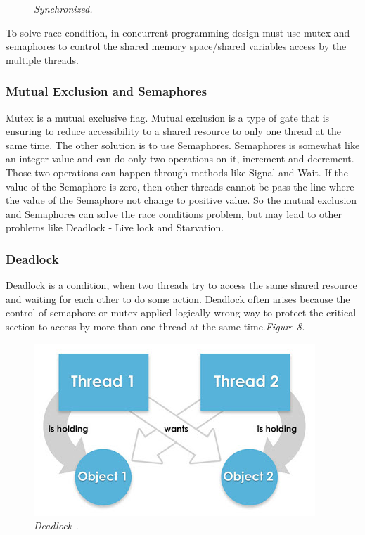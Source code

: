 \documentclass[12pt]{article}
\begin{document}
\begin{figure}[h!]
\begin{minipage}[h!]{0.4\textwidth}
    \caption{\textit{\color{gray}Synchronized\cite{Florian}.}}
  \end{minipage}
\end{figure}

To solve race condition, in concurrent programming design must use mutex and semaphores to control the shared memory space/shared variables access by the multiple threads.

	\subsubsection{Mutual Exclusion and Semaphores}
Mutex is a mutual exclusive flag. Mutual exclusion is a type of gate that is ensuring to reduce accessibility to a shared resource to only one thread at the same time. The other solution is to use Semaphores. Semaphores is somewhat like an integer value and can do only two operations on it, increment and decrement. Those two operations can happen through methods like Signal and Wait. If the value of the Semaphore is zero, then other threads cannot be pass the line where the value of the Semaphore not change to positive value.\citep{Nick&Julie}
So the mutual exclusion and Semaphores can solve the race conditions problem, but may lead to other problems like Deadlock - Live lock and Starvation.

	\subsubsection{Deadlock}
Deadlock is a condition, when two threads try to access the same shared resource and waiting for each other to do some action. Deadlock often arises because the control of semaphore or mutex applied logically wrong way to protect the critical section to access by more than one thread at the same time.\textit{\color{gray}Figure 8.}

\begin{figure}[h!]
\centering
\includegraphics[scale=0.5]{Pictures/deadlock.png}
\caption{\textit{\color{gray}Deadlock \cite{Paul}.}}
\end{figure}
\end{document}
